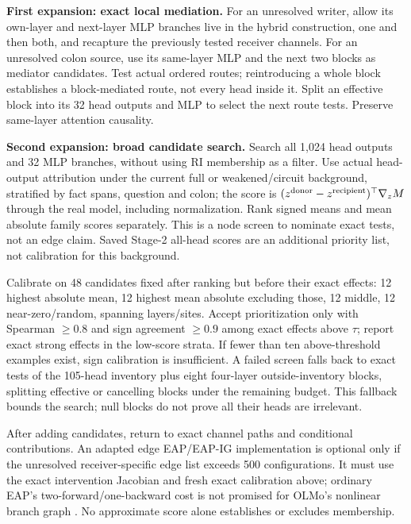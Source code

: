 \documentclass[11pt,a4paper]{article}
\begin{document}
\textbf{First expansion: exact local mediation.} For an unresolved writer, allow
its own-layer and next-layer MLP branches live in the hybrid construction, one and
then both, and recapture the previously tested receiver channels. For an unresolved
colon source, use its same-layer MLP and the next two blocks as mediator candidates.
Test actual ordered routes; reintroducing a whole block establishes a block-mediated
route, not every head inside it. Split an effective block into its 32 head outputs
and MLP to select the next route tests. Preserve same-layer attention causality.

\textbf{Second expansion: broad candidate search.} Search all 1,024 head outputs
and 32 MLP branches, without using RI membership as a filter. Use actual
head-output attribution under the current full or weakened/circuit background,
stratified by fact spans, question and colon; the score is
$(z^{\rm donor}-z^{\rm recipient})^\top\nabla_z M$ through the real model, including
normalization. Rank signed means and mean absolute family scores separately.
This is a node screen to nominate exact tests, not an edge claim. Saved Stage-2
all-head scores are an additional priority list, not calibration for this background.

Calibrate on 48 candidates fixed after ranking but before their exact effects:
12 highest absolute mean, 12 highest mean absolute excluding those, 12 middle,
12 near-zero/random, spanning layers/sites. Accept prioritization only with Spearman
$\ge0.8$ and sign agreement $\ge0.9$ among exact effects above $\tau$; report exact
strong effects in the low-score strata. If fewer than ten above-threshold examples
exist, sign calibration is insufficient. A failed screen falls back to exact tests
of the 105-head inventory plus eight four-layer outside-inventory blocks, splitting
effective or cancelling blocks under the remaining budget. This fallback bounds the
search; null blocks do not prove all their heads are irrelevant.

After adding candidates, return to exact channel paths and conditional contributions.
An adapted edge EAP/EAP-IG implementation is optional only if the unresolved
receiver-specific edge list exceeds 500 configurations. It must use the exact
intervention Jacobian and fresh exact calibration above; ordinary EAP's
two-forward/one-backward cost is not promised for OLMo's nonlinear branch graph
\cite{eap,faith}. No approximate score alone establishes or excludes membership.
\end{document}
